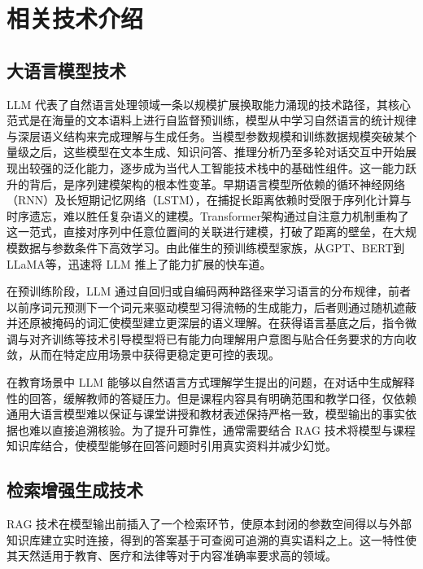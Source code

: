 \chapter{相关技术介绍}

\section{大语言模型技术}

LLM 代表了自然语言处理领域一条以规模扩展换取能力涌现的技术路径，其核心范式是在海量的文本语料上进行自监督预训练，模型从中学习自然语言的统计规律与深层语义结构来完成理解与生成任务。当模型参数规模和训练数据规模突破某个量级之后，这些模型在文本生成、知识问答、推理分析乃至多轮对话交互中开始展现出较强的泛化能力，逐步成为当代人工智能技术栈中的基础性组件\cite{touvron2023llama}。这一能力跃升的背后，是序列建模架构的根本性变革。早期语言模型所依赖的循环神经网络（RNN）及长短期记忆网络（LSTM），在捕捉长距离依赖时受限于序列化计算与时序遗忘，难以胜任复杂语义的建模\cite{elman1990finding}\cite{graves2012long}。Transformer架构通过自注意力机制重构了这一范式，直接对序列中任意位置间的关联进行建模\cite{vaswani2017attention}，打破了距离的壁垒，在大规模数据与参数条件下高效学习。由此催生的预训练模型家族，从GPT、BERT到LLaMA等，迅速将 LLM 推上了能力扩展的快车道\cite{brown2020language}\cite{devlin2019bert}\cite{touvron2023llama}。

在预训练阶段，LLM 通过自回归或自编码两种路径来学习语言的分布规律，前者以前序词元预测下一个词元来驱动模型习得流畅的生成能力，后者则通过随机遮蔽并还原被掩码的词汇使模型建立更深层的语义理解\cite{brown2020language}\cite{devlin2019bert}。在获得语言基底之后，指令微调与对齐训练等技术引导模型将已有能力向理解用户意图与贴合任务要求的方向收敛，从而在特定应用场景中获得更稳定更可控的表现\cite{ouyang2022training}。

在教育场景中 LLM 能够以自然语言方式理解学生提出的问题，在对话中生成解释性的回答，缓解教师的答疑压力。但是课程内容具有明确范围和教学口径，仅依赖通用大语言模型难以保证与课堂讲授和教材表述保持严格一致，模型输出的事实依据也难以直接追溯核验\cite{kasneci2023chatgpt}\cite{holmes2023guidance}。为了提升可靠性，通常需要结合 RAG 技术将模型与课程知识库结合，使模型能够在回答问题时引用真实资料并减少幻觉\cite{lewis2020retrieval}。

\section{检索增强生成技术}

RAG 技术在模型输出前插入了一个检索环节，使原本封闭的参数空间得以与外部知识库建立实时连接，得到的答案基于可查阅可追溯的真实语料之上\cite{lewis2020retrieval}。这一特性使其天然适用于教育、医疗和法律等对于内容准确率要求高的领域\cite{nguyen2022transformer}。

